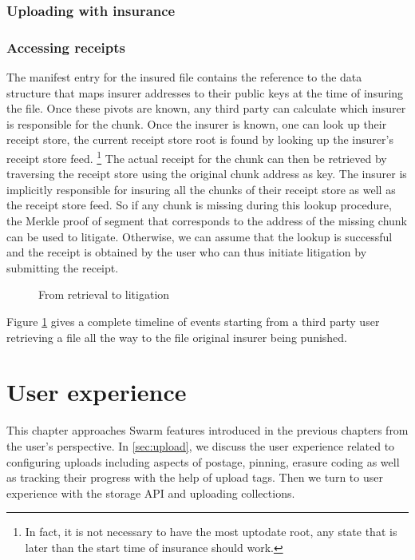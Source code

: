 \subsection{Uploading with insurance}


\subsection{Accessing receipts}

The manifest entry for the insured file contains the reference to the data structure that maps insurer addresses to their public keys at the time of insuring the file. Once these pivots are known, any third party can calculate which insurer is responsible for the chunk. Once the insurer is known, one can look up their receipt store, the current receipt store root is found by looking up the insurer's receipt store feed.%
%
\footnote{In fact, it is not necessary to have the most uptodate root, any state that is later than the start time of insurance should work.}
%
The actual receipt for the chunk can then be retrieved by traversing the receipt store using the original chunk address as key. The insurer is implicitly responsible for insuring all the chunks of their receipt store as well as the receipt store feed. So if any chunk is missing during this lookup procedure, the Merkle proof of segment that corresponds to the address of the missing chunk can be used to litigate. 
Otherwise, we can assume that the lookup is successful and the receipt is obtained by the user who can thus initiate litigation by submitting the receipt. 


\begin{figure}[htbp]
  \centering
  \caption[From retrieval to litigation]{From retrieval to litigation}
  \label{fig:flowchart-retrieval-litigation}
\end{figure}


Figure \ref{fig:flowchart-retrieval-litigation} gives a complete timeline of events starting from a third party user retrieving a file all the way to the file original insurer being punished.





\chapter{User experience}\label{sec:ux}

This chapter approaches Swarm features introduced in the previous chapters from the user's perspective. In \ref{sec:upload}, we discuss the user experience related to configuring uploads including aspects of postage, pinning, erasure coding as well as tracking their progress with the help of upload tags. Then we turn to user experience with the storage API and uploading collections. 

